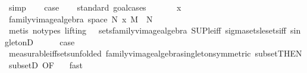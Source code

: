 \begin{isabellebody}
\ simp\isanewline
\ \ \isamarkupfalse%
\ {\isacharquery}{\kern0pt}case\isanewline
\ \ \isamarkupfalse%
\ {\isacharparenleft}{\kern0pt}standard{\isacharcomma}{\kern0pt}\ goal{\isacharunderscore}{\kern0pt}cases{\isacharparenright}{\kern0pt}\isanewline
\ \ \ \ \isamarkupfalse%
\ {\isacharparenleft}{\kern0pt}{}\ x{\isacharparenright}{\kern0pt}\isanewline
\ \ \ \ \isamarkupfalse%
\ {\isachardoublequoteopen}family{\isacharunderscore}{\kern0pt}vimage{\isacharunderscore}{\kern0pt}algebra\ {\isacharparenleft}{\kern0pt}space\ N{\isacharparenright}{\kern0pt}\ {\isacharbraceleft}{\kern0pt}x{\isacharbraceright}{\kern0pt}\ M\ {\isasymsubseteq}\ N{\isachardoublequoteclose}\ \isamarkupfalse%
\ {\isacharparenleft}{\kern0pt}metis\ {\isacharparenleft}{\kern0pt}no{\isacharunderscore}{\kern0pt}types{\isacharcomma}{\kern0pt}\ lifting{\isacharparenright}{\kern0pt}\ {}\ {}\ sets{\isacharunderscore}{\kern0pt}family{\isacharunderscore}{\kern0pt}vimage{\isacharunderscore}{\kern0pt}algebra\ SUP{\isacharunderscore}{\kern0pt}le{\isacharunderscore}{\kern0pt}iff\ sigma{\isacharunderscore}{\kern0pt}sets{\isacharunderscore}{\kern0pt}le{\isacharunderscore}{\kern0pt}sets{\isacharunderscore}{\kern0pt}iff\ singletonD{\isacharparenright}{\kern0pt}\isanewline
\ \ \ \ \isamarkupfalse%
\ {\isacharquery}{\kern0pt}case\ \isamarkupfalse%
\ measurable{\isacharunderscore}{\kern0pt}iff{\isacharunderscore}{\kern0pt}sets{\isacharbrackleft}{\kern0pt}unfolded\ family{\isacharunderscore}{\kern0pt}vimage{\isacharunderscore}{\kern0pt}algebra{\isacharunderscore}{\kern0pt}singleton{\isacharbrackleft}{\kern0pt}symmetric{\isacharbrackright}{\kern0pt}{\isacharbrackright}{\kern0pt}\ subset{\isacharbrackleft}{\kern0pt}THEN\ subsetD{\isacharcomma}{\kern0pt}\ OF\ {}{\isacharbrackright}{\kern0pt}\ \isamarkupfalse%
\ fast\ \isanewline
\ \ \isamarkupfalse%
\isanewline
{}\isamarkupfalse%
%
\endisatagproof
{\isafoldproof}%
%
\isadelimproof
\isanewline
%
\endisadelimproof
%
\isadelimtheory
\isanewline
%
\endisadelimtheory
%
\isatagtheory
{}\isamarkupfalse%
%
\endisatagtheory
{\isafoldtheory}%
%
\isadelimtheory
%
\endisadelimtheory
%
\end{isabellebody}%
\endinput
